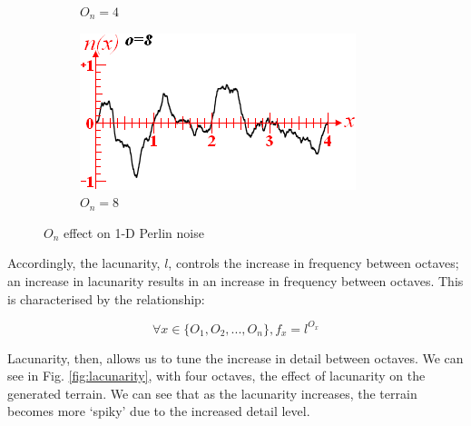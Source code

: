 \documentclass[12pt]{article}
\begin{document}
\begin{figure}[ht]
\begin{subfigure}{0.4\textwidth}
        \caption{$O_n=4$}
        \label{fig:octave4}
    \end{subfigure}
    \hfill
    \begin{subfigure}{0.4\textwidth}
        \centering
        \includegraphics[width=\linewidth]{octave8.png}
        \caption{$O_n=8$}
        \label{fig:octave8}
    \end{subfigure}
    \caption{$O_n$ effect on 1-D Perlin noise\cite{libnoise}}
    \label{fig:octaves-1d}
\end{figure}

Accordingly, the lacunarity, $l$, controls the increase in frequency between octaves; an increase in lacunarity results in an increase in frequency between octaves. This is characterised by the relationship:

$$\forall x \in \{O_1,O_2,...,O_n\}, f_x = l^{O_x}$$

Lacunarity, then, allows us to tune the increase in detail between octaves. We can see in Fig. \ref{fig:lacunarity}, with four octaves, the effect of lacunarity on the generated terrain. We can see that as the lacunarity increases, the terrain becomes more `spiky' due to the increased detail level.
\end{document}
